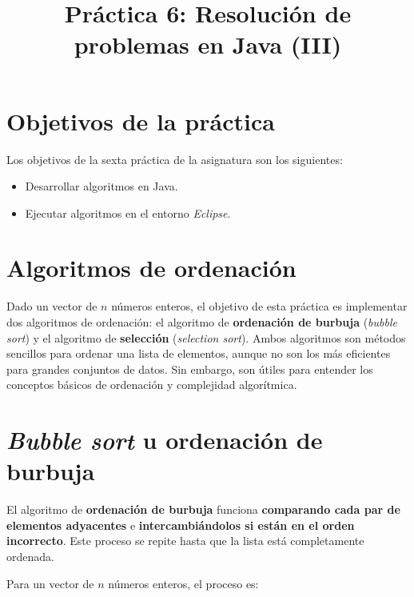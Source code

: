 \documentclass[
  spanish,
  11pt,
  a4paper,
  DIV=11,
  numbers=noendperiod]{scrartcl}
\title{Práctica 6: Resolución de problemas en Java (III)}
\author{}
\date{}
\providecommand{\tightlist}{\setlength{\itemsep}{0pt}\setlength{\parskip}{0pt}}
\begin{document}
\maketitle

\renewcommand*\contentsname{Tabla de contenidos}
{
\hypersetup{linkcolor=}
\setcounter{tocdepth}{2}
\tableofcontents
}

\clearpage

\section{Objetivos de la práctica}\label{objetivos-de-la-practica}

Los objetivos de la sexta práctica de la asignatura son los siguientes:

\begin{itemize}
\tightlist
\item Desarrollar algoritmos en Java.
\item Ejecutar algoritmos en el entorno \emph{Eclipse}.
\end{itemize}

\section{Algoritmos de ordenación}\label{algoritmos-de-ordenacion}

Dado un vector de \(n\) números enteros, el objetivo de esta práctica es implementar dos algoritmos de ordenación: el algoritmo de \textbf{ordenación de burbuja} (\emph{bubble sort}) y el algoritmo de \textbf{selección} (\emph{selection sort}). Ambos algoritmos son métodos sencillos para ordenar una lista de elementos, aunque no son los más eficientes para grandes conjuntos de datos. Sin embargo, son útiles para entender los conceptos básicos de ordenación y complejidad algorítmica.

\section{\texorpdfstring{\emph{Bubble sort} u ordenación de burbuja}{Bubble sort u ordenación de burbuja}}\label{bubble-sort-u-ordenacion-de-burbuja}

El algoritmo de \textbf{ordenación de burbuja} funciona \textbf{comparando cada par de elementos adyacentes} e \textbf{intercambiándolos si están en el orden incorrecto}. Este proceso se repite hasta que la lista está completamente ordenada.

Para un vector de \(n\) números enteros, el proceso es:
\end{document}

